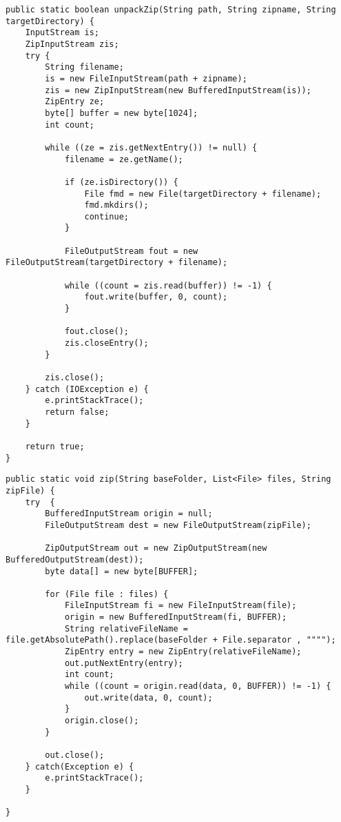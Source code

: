 \begin{lstlisting}[style=MyJavaSmallStyle, caption={Query code\todo{Simply listing 1 and listing 2 and put them side by side}}, label={lst:mot-query}]
public static boolean unpackZip(String path, String zipname, String targetDirectory) {
	InputStream is;
	ZipInputStream zis;
	try {
		String filename;
		is = new FileInputStream(path + zipname);
		zis = new ZipInputStream(new BufferedInputStream(is));
		ZipEntry ze;
		byte[] buffer = new byte[1024];
		int count;

		while ((ze = zis.getNextEntry()) != null) {
			filename = ze.getName();

			if (ze.isDirectory()) {
				File fmd = new File(targetDirectory + filename);
				fmd.mkdirs();
				continue;
			}

			FileOutputStream fout = new FileOutputStream(targetDirectory + filename);

			while ((count = zis.read(buffer)) != -1) {
				fout.write(buffer, 0, count);
			}

			fout.close();
			zis.closeEntry();
		}

		zis.close();
	} catch (IOException e) {
		e.printStackTrace();
		return false;
	}

	return true;
}
\end{lstlisting}



\begin{lstlisting}[style=MyJavaSmallStyle, caption={Recommended related code}, label={lst:mot-related}]
public static void zip(String baseFolder, List<File> files, String zipFile) {
	try  {
		BufferedInputStream origin = null;
		FileOutputStream dest = new FileOutputStream(zipFile);

		ZipOutputStream out = new ZipOutputStream(new BufferedOutputStream(dest));
		byte data[] = new byte[BUFFER];

		for (File file : files) {
			FileInputStream fi = new FileInputStream(file);
			origin = new BufferedInputStream(fi, BUFFER);
			String relativeFileName = file.getAbsolutePath().replace(baseFolder + File.separator , """");
			ZipEntry entry = new ZipEntry(relativeFileName);
			out.putNextEntry(entry);
			int count;
			while ((count = origin.read(data, 0, BUFFER)) != -1) {
				out.write(data, 0, count);
			}
			origin.close();
		}

		out.close();
	} catch(Exception e) {
		e.printStackTrace();
	}

}
\end{lstlisting}
